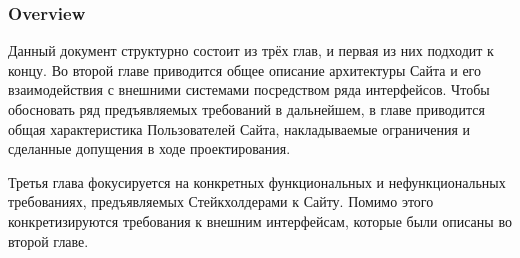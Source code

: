 \subsubsection{Overview}

Данный документ структурно состоит из трёх глав, и первая из них подходит к концу. Во второй главе приводится общее описание архитектуры Сайта и его взаимодействия с внешними системами посредством ряда интерфейсов. Чтобы обосновать ряд предъявляемых требований в дальнейшем, в главе приводится общая характеристика Пользователей Сайта, накладываемые ограничения и сделанные допущения в ходе проектирования. 

Третья глава фокусируется на конкретных функциональных и нефункциональных требованиях, предъявляемых Стейкхолдерами к Сайту. Помимо этого конкретизируются требования к внешним интерфейсам, которые были описаны во второй главе.